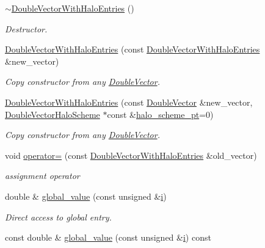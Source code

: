 \begin{DoxyCompactItemize}
\hyperlink{classoomph_1_1DoubleVectorWithHaloEntries_aff20c271cfabd18132df864d24ad5cbf}{$\sim$\+Double\+Vector\+With\+Halo\+Entries} ()
\begin{DoxyCompactList}\small\item\em Destructor. \end{DoxyCompactList}\item 
\hyperlink{classoomph_1_1DoubleVectorWithHaloEntries_a9bef4c069e52aa1aa394e8b0b75d3367}{Double\+Vector\+With\+Halo\+Entries} (const \hyperlink{classoomph_1_1DoubleVectorWithHaloEntries}{Double\+Vector\+With\+Halo\+Entries} \&new\+\_\+vector)
\begin{DoxyCompactList}\small\item\em Copy constructor from any \hyperlink{classoomph_1_1DoubleVector}{Double\+Vector}. \end{DoxyCompactList}\item 
\hyperlink{classoomph_1_1DoubleVectorWithHaloEntries_a4af6e4f6038ea0071b7b19d4f4c1a859}{Double\+Vector\+With\+Halo\+Entries} (const \hyperlink{classoomph_1_1DoubleVector}{Double\+Vector} \&new\+\_\+vector, \hyperlink{classoomph_1_1DoubleVectorHaloScheme}{Double\+Vector\+Halo\+Scheme} $\ast$const \&\hyperlink{classoomph_1_1DoubleVectorWithHaloEntries_a233cb55111ceb501a7a76c434801be4c}{halo\+\_\+scheme\+\_\+pt}=0)
\begin{DoxyCompactList}\small\item\em Copy constructor from any \hyperlink{classoomph_1_1DoubleVector}{Double\+Vector}. \end{DoxyCompactList}\item 
void \hyperlink{classoomph_1_1DoubleVectorWithHaloEntries_aac1e401b12a149b56fe0d6211487d30c}{operator=} (const \hyperlink{classoomph_1_1DoubleVectorWithHaloEntries}{Double\+Vector\+With\+Halo\+Entries} \&old\+\_\+vector)
\begin{DoxyCompactList}\small\item\em assignment operator \end{DoxyCompactList}\item 
double \& \hyperlink{classoomph_1_1DoubleVectorWithHaloEntries_a8891ed97a65045e43f906237b109dad2}{global\+\_\+value} (const unsigned \&\hyperlink{cfortran_8h_adb50e893b86b3e55e751a42eab3cba82}{i})
\begin{DoxyCompactList}\small\item\em Direct access to global entry. \end{DoxyCompactList}\item 
const double \& \hyperlink{classoomph_1_1DoubleVectorWithHaloEntries_a5a78785cedfe5bac2367f956b72f302b}{global\+\_\+value} (const unsigned \&\hyperlink{cfortran_8h_adb50e893b86b3e55e751a42eab3cba82}{i}) const

\end{DoxyCompactItemize}
